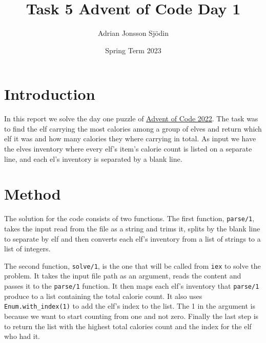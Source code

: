 \documentclass[a4paper,11pt]{article}
\begin{document}
\title{
    \textbf{Task 5 Advent of Code Day 1}
}
\author{Adrian Jonsson Sjödin}
\date{Spring Term 2023}

\maketitle

\section*{Introduction}
In this report we solve the day one puzzle of \href{https://adventofcode.com/2022}{Advent of Code 2022}. The task was to find the 
elf carrying the most calories among a group of elves and return which elf it was and how many calories they where carrying in total.
As input we have the elves inventory where every elf's item's calorie count is listed on a separate line, and each el's inventory is 
separated by a blank line.

\section*{Method}
The solution for the code consists of two functions. The first function, {\tt parse/1}, takes the 
input read from the file as a string and trims it, splits by the blank line to separate by elf 
and then converts each elf's inventory from a list of strings to a list of integers. 

The second function, {\tt solve/1}, is the one that will be called from {\tt iex} to solve the 
problem. It takes the input file path as an argument, reads the content and passes it to the 
{\tt parse/1} function. It then maps each elf's inventory that {\tt parse/1} produce to a list 
containing the total calorie count. It also uses {\tt Enum.with\_index(1)} to add the elf's index 
to the list. The 1 in the argument is because we want to start counting from one and not zero. 
Finally the last step is to return the list with the highest total calories count and the index 
for the elf who had it.


\end{document}
